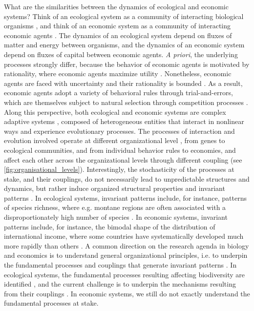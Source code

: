 What are the similarities between the dynamics of ecological and economic systems? 
% 
Think of an ecological system as a community of interacting biological organisms \citep{chapin2002principles}, and think of an economic system as a community of interacting economic agents \citep{Dopfer2007}.
% 
The dynamics of an ecological system depend on fluxes of matter and energy between organisms, and the dynamics of an economic system depend on fluxes of capital between economic agents.
% 
\textit{A priori}, the underlying processes strongly differ, because the behavior of economic agents is motivated by rationality, where economic agents maximize utility \citep{10.1093/cje/bet027}. 
% 
Nonetheless, economic agents are faced with uncertainty \citep{Foster2012} and their rationality is bounded \citep{Veblen1898,nelson1985evolutionary}. As a result, economic agents adopt a variety of behavioral rules \citep{Foster2012} through trial-and-errors, which are themselves subject to natural selection through competition processes \citep{schumpeter2017theory}.
% 
Along this perspective, both ecological and economic systems are complex adaptive systems \citep{Levin2002}, composed of heterogeneous entities that interact in nonlinear ways and experience evolutionary processes. 
% 
% 
The processes of interaction and evolution involved operate at different organizational level \citep{Levin1998}, from genes to ecological communities, and from individual behavior rules to economies, and affect each other across the organizational levels through different coupling (see \cref{fig:organisational_levels}).
% 
Interestingly, the stochasticity of the processes at stake, and their couplings, do not necessarily lead to unpredictable structures and dynamics, but rather induce organized structural properties and invariant patterns \citep{Olff2009,mitchell2009complexity}. 
% 
In ecological systems, invariant patterns include, for instance, patterns of species richness, where e.g. montane regions are often associated with a disproportionately high number of species \citep{Rahbek2019}. In economic systems, invariant patterns include, for instance, the bimodal shape of the distribution of international income, where some countries have systematically developed much more rapidly than others \citep{acemoglu2001colonial}. 
% 
A common direction on the research agenda in biology and economics is to understand general organizational principles, i.e.  to underpin the fundamental processes and couplings that generate invariant patterns \citep{Levin2002,Olff2009,Veldhuis2018}.
% 
In ecological systems, the fundamental processes resulting affecting biodiversity are identified \citep{Rahbek2019a,Rangel2018,Hagen2022}, and the current challenge is to underpin the mechanisms resulting from their couplings \citep{Hagen2022}.
% 
In economic systems, we still do not exactly understand the fundamental processes at stake. 


